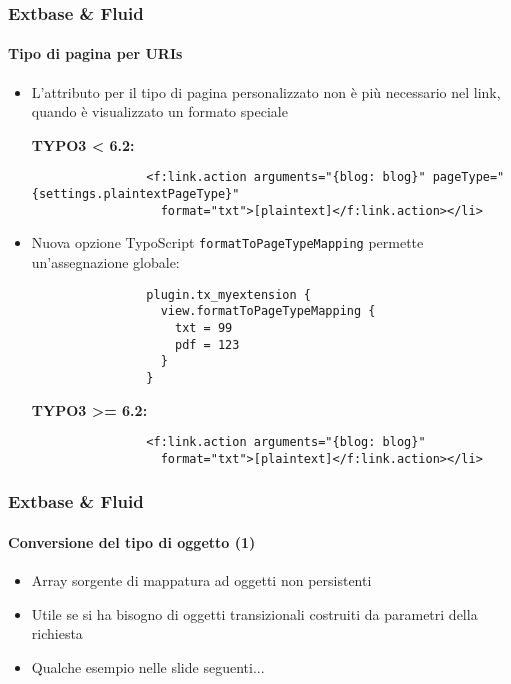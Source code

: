 
\begin{frame}[fragile]
	\frametitle{Extbase \& Fluid}
	\framesubtitle{Tipo di pagina per URIs}

	\lstset{
		basicstyle=\tiny\ttfamily
	}

	\begin{itemize}
		\item L'attributo per il tipo di pagina personalizzato non è più necessario nel link, quando è visualizzato un formato speciale

			\smaller\textbf{TYPO3 < 6.2:}\normalsize
			\begin{lstlisting}
				<f:link.action arguments="{blog: blog}" pageType="{settings.plaintextPageType}"
				  format="txt">[plaintext]</f:link.action></li>
			\end{lstlisting}

		\item Nuova opzione TypoScript \texttt{formatToPageTypeMapping} permette un'assegnazione globale:

			\begin{lstlisting}
				plugin.tx_myextension {
				  view.formatToPageTypeMapping {
				    txt = 99
				    pdf = 123
				  }
				}
			\end{lstlisting}

			\smaller\textbf{TYPO3 >= 6.2:}\normalsize
			\begin{lstlisting}
				<f:link.action arguments="{blog: blog}"
				  format="txt">[plaintext]</f:link.action></li>
			\end{lstlisting}

	\end{itemize}

\end{frame}


\begin{frame}[fragile]
	\frametitle{Extbase \& Fluid}
	\framesubtitle{Conversione del tipo di oggetto (1)}

	\begin{itemize}
		\item Array sorgente di mappatura ad oggetti non persistenti
		\item Utile se si ha bisogno di oggetti transizionali costruiti da parametri della richiesta
		\item Qualche esempio nelle slide seguenti...

	\end{itemize}

\end{frame}

